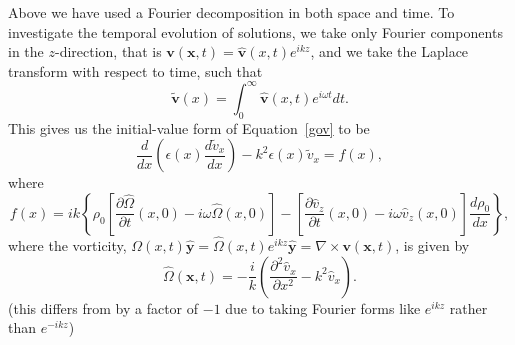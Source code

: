 \documentclass{aastex61}
\begin{document}
Above we have used a Fourier decomposition in both space and time. To investigate the temporal evolution of solutions, we take only Fourier components in the $z$-direction, that is $\mathbf{v}(\mathbf{x},t) = \mathbf{\hat{v}}(x,t)e^{ikz}$, and we take the Laplace transform with respect to time, such that
\begin{equation}
\mathbf{\tilde{v}}(x) = \int_0^\infty \mathbf{\widehat{v}}(x,t)e^{i\omega t} dt.
\end{equation}
This gives us the initial-value form of Equation~\eqref{gov} to be
\begin{equation}
\frac{d}{dx}\left(\epsilon(x) \frac{d\tilde{v}_x}{dx}\right) - k^2\epsilon(x)\tilde{v}_x = f(x),
\label{ivp gov}
\end{equation}
where
\begin{equation}
f(x) = ik\left\{\rho_0\left[\frac{\partial\hat{\Omega}}{\partial t}(x,0) - i\omega\hat{\Omega}(x,0)\right] - \left[\frac{\partial\hat{v}_z}{\partial t}(x,0) - i\omega \hat{v}_z(x,0)\right]\frac{d\rho_0}{dx}\right\},
\label{f}
\end{equation}
where the vorticity, $\Omega(x,t)\mathbf{\hat{y}} = \hat{\Omega}(x,t)e^{ikz}\mathbf{\hat{y}} = \nabla \times \mathbf{v}(\mathbf{x},t)$, is given by
\begin{equation}
\hat{\Omega}(\mathbf{x},t) = -\frac{i}{k}\left(\frac{\partial^2\hat{v}_x}{\partial x^2} - k^2 \hat{v}_x\right).
\end{equation}
(this differs from \cite{rae_etal81} by a factor of $-1$ due to taking Fourier forms like $e^{ikz}$ rather than $e^{-ikz}$)
\end{document}
